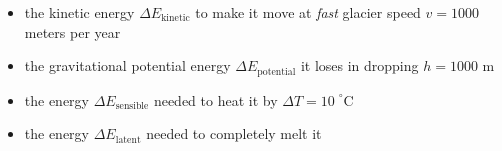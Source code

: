 \documentclass{beamer}
\begin{document}
\begin{frame}
\begin{columns}
\begin{column}{0.85\textwidth}
\begin{itemize}
\item the kinetic energy $\Delta E_{\text{kinetic}}$ to make it move at \emph{fast} glacier speed $v=1000$ meters per year
\item the gravitational potential energy $\Delta E_{\text{potential}}$ it loses in dropping $h=1000$ m
\item the energy $\Delta E_{\text{sensible}}$ needed to heat it by $\Delta T = 10\phantom{|}^\circ\text{C}$
\item the energy $\Delta E_{\text{latent}}$ needed to completely melt it
\end{itemize}
\end{column}
\end{columns}
\end{frame}

\end{document}
